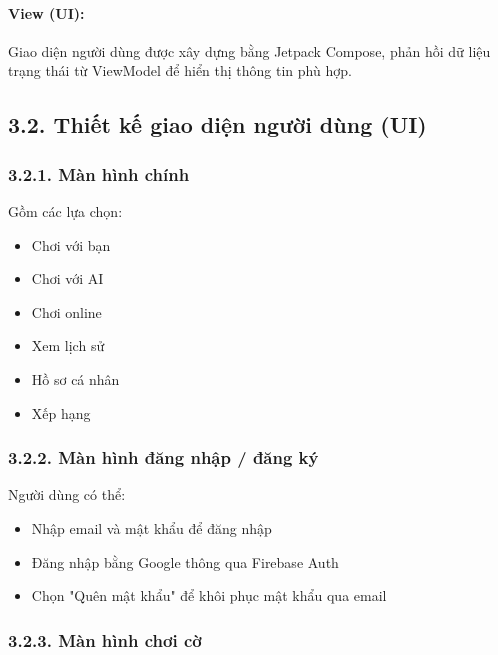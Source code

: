 \documentclass[a4paper,12pt]{article}
\begin{document}
\paragraph{View (UI):} %
\noindent Giao diện người dùng được xây dựng bằng Jetpack Compose, phản hồi dữ liệu trạng thái từ ViewModel để hiển thị thông tin phù hợp.

\subsection*{3.2. Thiết kế giao diện người dùng (UI)} %

\subsubsection*{3.2.1. Màn hình chính} %

\noindent Gồm các lựa chọn:
\begin{itemize}[label=·]
    \item Chơi với bạn
    \item Chơi với AI
    \item Chơi online
    \item Xem lịch sử
    \item Hồ sơ cá nhân
    \item Xếp hạng
\end{itemize}

\subsubsection*{3.2.2. Màn hình đăng nhập / đăng ký} %

\noindent Người dùng có thể:
\begin{itemize}[label=·]
    \item Nhập email và mật khẩu để đăng nhập
    \item Đăng nhập bằng Google thông qua Firebase Auth
    \item Chọn "Quên mật khẩu" để khôi phục mật khẩu qua email
\end{itemize}

\subsubsection*{3.2.3. Màn hình chơi cờ} %
\end{document}
